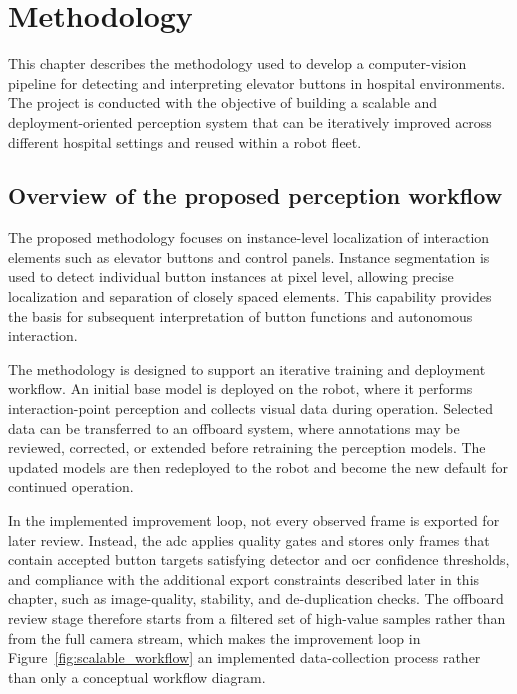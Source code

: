 \chapter{Methodology}
\label{ch:methodology}

This chapter describes the methodology used to develop a computer-vision pipeline
for detecting and interpreting elevator buttons in hospital environments. The
project is conducted with the objective of building a scalable and
deployment-oriented perception system that can be iteratively improved across
different hospital settings and reused within a robot fleet.

\section{Overview of the proposed perception workflow}

The proposed methodology focuses on instance-level localization of interaction
elements such as elevator buttons and control panels. Instance segmentation is used
to detect individual button instances at pixel level, allowing precise localization
and separation of closely spaced elements. This capability provides the basis for
subsequent interpretation of button functions and autonomous interaction.

The methodology is designed to support an iterative training and deployment
workflow. An initial base model is deployed on the robot, where it performs
interaction-point perception and collects visual data during operation. Selected
data can be transferred to an offboard system, where annotations may be reviewed,
corrected, or extended before retraining the perception models. The updated models
are then redeployed to the robot and become the new default for continued operation.

In the implemented improvement loop, not every observed frame is exported for
later review. Instead, the \gls{adc} applies quality gates and stores only 
frames that contain accepted button targets satisfying detector and \gls{ocr} confidence thresholds,
 and compliance with the additional export
constraints described later in this chapter, such as image-quality, stability,
and de-duplication checks. The offboard review stage therefore starts from a
filtered set of high-value samples rather than from the full camera stream,
which makes the improvement loop in Figure~\ref{fig:scalable_workflow} an
implemented data-collection process rather than only a conceptual workflow diagram.

